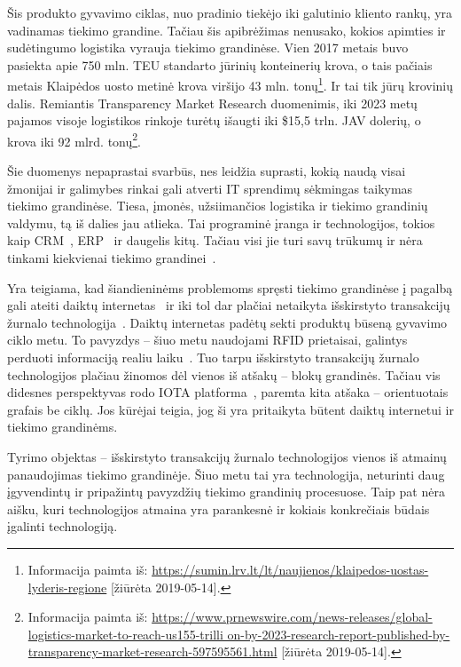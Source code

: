 Šis produkto gyvavimo ciklas, nuo pradinio tiekėjo iki galutinio kliento rankų, yra vadinamas tiekimo grandine. Tačiau šis apibrėžimas nenusako, kokios apimties ir sudėtingumo logistika vyrauja tiekimo grandinėse. Vien 2017 metais buvo pasiekta apie 750 mln. TEU standarto jūrinių konteinerių krova\footnotemark[3], o tais pačiais metais Klaipėdos uosto metinė krova viršijo 43 mln. tonų\footnote{Informacija paimta iš: \href{https://sumin.lrv.lt/lt/naujienos/klaipedos-uostas-lyderis-regione}{https://sumin.lrv.lt/lt/naujienos/klaipedos-uostas-lyderis-regione} [žiūrėta 2019-05-14].}. Ir tai tik jūrų krovinių dalis. Remiantis Transparency Market Research duomenimis, iki 2023 metų pajamos visoje logistikos rinkoje turėtų išaugti iki \$15,5 trln. JAV dolerių, o krova iki 92 mlrd. tonų\footnote{Informacija paimta iš: \href{https://www.prnewswire.com/news-releases/global-logistics-market-to-reach-us155-trillion-by-2023-research-report-published-by-transparency-market-research-597595561.html}{https://www.prnewswire.com/news-releases/global-logistics-market-to-reach-us155-trilli on-by-2023-research-report-published-by-transparency-market-research-597595561.html} [žiūrėta 2019-05-14].}.

Šie duomenys nepaprastai svarbūs, nes leidžia suprasti, kokią naudą visai žmonijai ir galimybes rinkai gali atverti IT sprendimų sėkmingas taikymas tiekimo grandinėse. Tiesa, įmonės, užsiimančios logistika ir tiekimo grandinių valdymu, tą iš dalies jau atlieka. Tai programinė įranga ir technologijos, tokios kaip CRM~\cite{bharati2015current}, ERP~\cite{neubert2018collaboration} ir daugelis kitų. Tačiau visi jie turi savų trūkumų ir nėra tinkami kiekvienai tiekimo grandinei~\cite{garg2018supply}.

Yra teigiama, kad šiandieninėms problemoms spręsti tiekimo grandinėse į pagalbą gali ateiti daiktų internetas~\cite{dweekat2017supply} ir iki tol dar plačiai netaikyta išskirstyto transakcijų žurnalo technologija~\cite{abeyratne2016blockchain}. Daiktų internetas padėtų sekti produktų būseną gyvavimo ciklo metu. To pavyzdys – šiuo metu naudojami RFID prietaisai, galintys perduoti informaciją realiu laiku~\cite{majeed2017internet}. Tuo tarpu išskirstyto transakcijų žurnalo technologijos plačiau žinomos dėl vienos iš atšakų – blokų grandinės. Tačiau vis didesnes perspektyvas rodo IOTA platforma~\cite{popov2016tangle}, paremta kita atšaka – orientuotais grafais be ciklų. Jos kūrėjai teigia, jog ši yra pritaikyta būtent daiktų internetui ir tiekimo grandinėms. 

Tyrimo objektas – išskirstyto transakcijų žurnalo technologijos vienos iš atmainų panaudojimas tiekimo grandinėje. Šiuo metu tai yra technologija, neturinti daug įgyvendintų ir pripažintų pavyzdžių tiekimo grandinių procesuose. Taip pat nėra aišku, kuri technologijos atmaina yra parankesnė ir kokiais konkrečiais būdais įgalinti technologiją.

